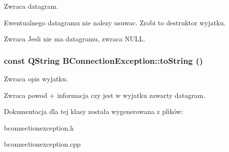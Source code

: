 Zwraca datagram. 

Ewentualnego datagramu nie nalezy usuwac. Zrobi to destruktor wyjatku.

\begin{DoxyReturn}{Zwraca}
Jesli nie ma datagramu, zwraca NULL. 
\end{DoxyReturn}
\hypertarget{class_b_connection_exception_a645db90a648e008820d2506a67aca2ec}{
\subsubsection[{toString}]{\setlength{\rightskip}{0pt plus 5cm}const QString BConnectionException::toString ()}}
\label{class_b_connection_exception_a645db90a648e008820d2506a67aca2ec}


Zwraca opis wyjatku. 

\begin{DoxyReturn}{Zwraca}
powod + informacja czy jest w wyjatku zawarty datagram. 
\end{DoxyReturn}


Dokumentacja dla tej klasy została wygenerowana z plików:\begin{DoxyCompactItemize}
\item 
bconnectionexception.h\item 
bconnectionexception.cpp\end{DoxyCompactItemize}
